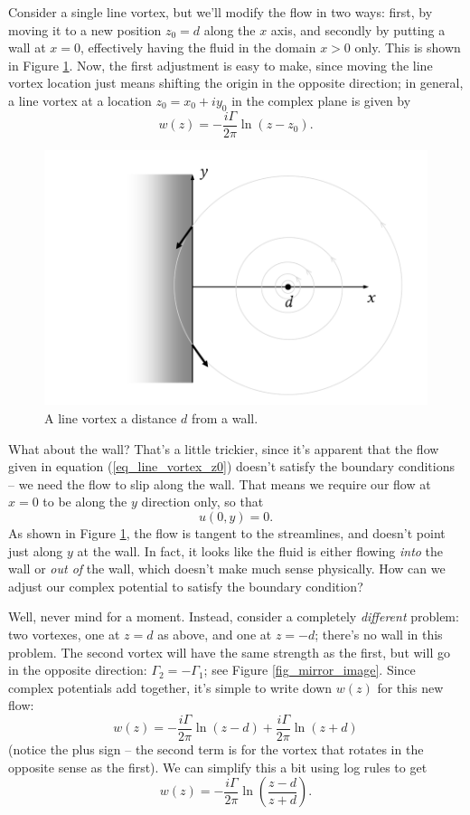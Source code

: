 Consider a single line vortex, but we'll modify the flow in two ways:  first, by moving it to a new position $z_0 = d$ along the $x$ axis, and secondly by putting a wall at $x=0$, effectively having the fluid in the domain $x>0$ only.  This is shown in Figure \ref{fig_mirror_wall}.  Now, the first adjustment is easy to make, since moving the line vortex location just means shifting the origin in the opposite direction; in general, a line vortex at a location $z_0 = x_0 + iy_0$ in the complex plane is given by
\begin{equation}
\label{eq_line_vortex_z0}
w(z) = -\frac{i\Gamma}{2\pi} \ln (z-z_0).
\end{equation}

\begin{figure}
\centering\includegraphics[width=0.75\linewidth]{Figures/Chapter4/fig_mirror_wall}
\caption{A line vortex a distance $d$ from a wall.}
\label{fig_mirror_wall}
\end{figure}

What about the wall?  That's a little trickier, since it's apparent that the flow given in equation (\ref{eq_line_vortex_z0}) doesn't satisfy the boundary conditions -- we need the flow to slip along the wall.  That means we require our flow at $x=0$ to be along the $y$ direction only, so that
\[
u(0, y) = 0.
\]
As shown in Figure  \ref{fig_mirror_wall}, the flow is tangent to the streamlines, and doesn't point just along $y$ at the wall.  In fact, it looks like the fluid is either flowing \emph{into} the wall or \emph{out of} the wall, which doesn't make much sense physically.  How can we adjust our complex potential to satisfy the boundary condition?

Well, never mind for a moment.  Instead, consider a completely \emph{different} problem:  two vortexes, one at $z = d$ as above, and one at $z = -d$; there's no wall in this problem.  The second vortex will have the same strength as the first, but will go in the opposite direction:  $\Gamma_2 = - \Gamma_1$; see Figure \ref{fig_mirror_image}.  Since complex potentials add together, it's simple to write down $w(z)$ for this new flow:
\[
w(z) = -\frac{i\Gamma}{2\pi} \ln (z-d) + \frac{i\Gamma}{2\pi} \ln (z+d)
\]
(notice the plus sign -- the second term is for the vortex that rotates in the opposite sense as the first).  We can simplify this a bit using log rules to get
\begin{equation}
\label{eq_mirror_vortex}
w(z) = -\frac{i\Gamma}{2\pi} \ln \left( \frac{z - d}{z+d} \right).
\end{equation}

